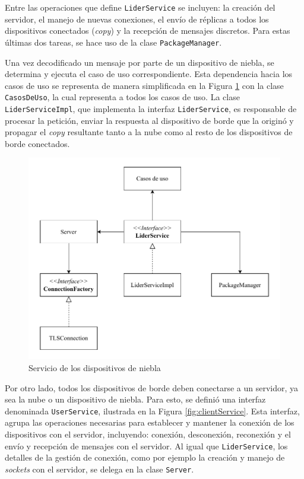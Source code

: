 Entre las operaciones que define \texttt{LiderService} se incluyen: la creación del servidor, el manejo de nuevas conexiones, el envío de réplicas a todos los dispositivos conectados (\textit{copy}) y la recepción de mensajes discretos. Para estas últimas dos tareas, se hace uso de la clase \texttt{PackageManager}.

Una vez decodificado un mensaje por parte de un dispositivo de niebla, se determina y ejecuta el caso de uso correspondiente. Esta dependencia hacia los casos de uso se representa de manera simplificada en la Figura \ref{fig:liderService} con la clase \texttt{CasosDeUso}, la cual representa a todos los casos de uso. La clase \texttt{LiderServiceImpl}, que implementa la interfaz \texttt{LiderService}, es responsable de procesar la petición, enviar la respuesta al dispositivo de borde que la originó y propagar el \textit{copy} resultante tanto a la nube como al resto de los dispositivos de borde conectados.




\begin{figure}
    \centering
    \includegraphics[width=\linewidth]{Imagenes/Implementacion/LiderService.pdf}
    \caption{Servicio de los dispositivos de niebla}
    \label{fig:liderService}
\end{figure}

Por otro lado, todos los dispositivos de borde deben conectarse a un servidor, ya sea la nube o un dispositivo de niebla. Para esto, se definió una interfaz denominada \texttt{UserService}, ilustrada en la Figura \ref{fig:clientService}. Esta interfaz, agrupa las operaciones necesarias para establecer y mantener la conexión de los dispositivos con el servidor, incluyendo: conexión, desconexión, reconexión y el envío y recepción de mensajes con el servidor. Al igual que \texttt{LiderService}, los detalles de la gestión de conexión, como por ejemplo la creación y manejo de \textit{sockets} con el servidor, se delega en la clase \texttt{Server}.

